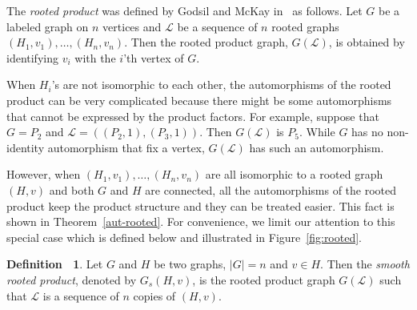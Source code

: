 \documentclass[12pt,a4paper, longbibliography]{article}
\theoremstyle{definition}
\newtheorem{definition}[theorem]{{\color{THM}Definition\ }}
\numberwithin{equation}{section}
\begin{document}
	The \emph{rooted product} was defined by Godsil and McKay in~\cite{godsil_mckay_1978} as follows. Let $G$ be a labeled graph on $n$	vertices and $\mathcal{L}$ be a sequence of $n$ rooted graphs $(H_1,v_1) ,\ldots, (H_n,v_n)$. Then the rooted product graph, $G(\mathcal{L})$, is  obtained by identifying $v_i$ with the $i$'th vertex of $G$.
	
	When $H_i$'s are not  isomorphic to each other, the automorphisms of the rooted product  can be very complicated because there might be some automorphisms that cannot be expressed  by the product factors. For example, suppose that $G=P_2$ and $\mathcal{L}=\left( (P_2,1) , (P_3,1)\right)$. Then $G(\mathcal{L})$ is $P_5$. While $G$ has no non-identity automorphism that fix a vertex, $G(\mathcal{L})$ has such an automorphism.
	
	However, when  $(H_1,v_1),\dots,(H_n,v_n)$ are all isomorphic to a rooted graph $(H,v)$ and both $G$ and $H$ are connected, all the automorphisms of the rooted product keep the product structure and they can be treated easier. This fact is shown in Theorem~\ref{aut-rooted}. For convenience, we limit our attention to this special case which is defined below and illustrated in Figure~\ref{fig:rooted}.
	
	\begin{definition}
		Let $G$ and $H$ be two graphs, $\vert G\vert=n$ and $v\in H$. Then the \emph{smooth rooted product}, denoted by $G_s(H,v)$, is the rooted product graph $G(\mathcal{L})$ such that $\mathcal{L}$ is a sequence of $n$ copies of $(H,v)$.
	\end{definition}
	
\end{document}
